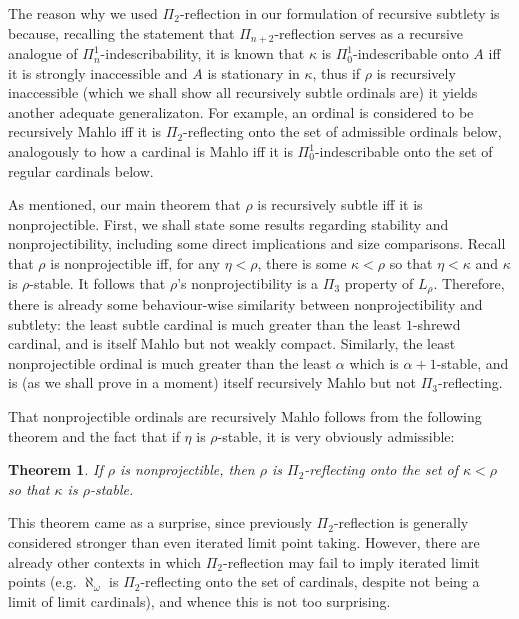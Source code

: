 \documentclass{article}
\theoremstyle{definition}
\theoremstyle{plain}
\newtheorem{theorem}[definition]{Theorem}
\theoremstyle{plain}
\theoremstyle{plain}
\theoremstyle{plain}
\theoremstyle{remark}
\theoremstyle{remark}
\theoremstyle{remark}
\theoremstyle{plain}
\theoremstyle{plain}
\theoremstyle{plain}
\begin{document}
The reason why we used $\Pi_2$-reflection in our formulation of recursive subtlety is because, recalling the statement that $\Pi_{n+2}$-reflection serves as a recursive analogue of $\Pi^1_n$-indescribability, it is known that $\kappa$ is $\Pi^1_0$-indescribable onto $A$ iff it is strongly inaccessible and $A$ is stationary in $\kappa$, thus if $\rho$ is recursively inaccessible (which we shall show all recursively subtle ordinals are) it yields another adequate generalizaton. For example, an ordinal is considered to be recursively Mahlo iff it is $\Pi_2$-reflecting onto the set of admissible ordinals below, analogously to how a cardinal is Mahlo iff it is $\Pi^1_0$-indescribable onto the set of regular cardinals below.

As mentioned, our main theorem that $\rho$ is recursively subtle iff it is nonprojectible. First, we shall state some results regarding stability and nonprojectibility, including some direct implications and size comparisons. Recall that $\rho$ is nonprojectible iff, for any $\eta < \rho$, there is some $\kappa < \rho$ so that $\eta < \kappa$ and $\kappa$ is $\rho$-stable. It follows that $\rho$'s nonprojectibility is a $\Pi_3$ property of $L_\rho$. Therefore, there is already some behaviour-wise similarity between nonprojectibility and subtlety: the least subtle cardinal is much greater than the least $1$-shrewd cardinal, and is itself Mahlo but not weakly compact. Similarly, the least nonprojectible ordinal is much greater than the least $\alpha$ which is $\alpha+1$-stable, and is (as we shall prove in a moment) itself recursively Mahlo but not $\Pi_3$-reflecting.

That nonprojectible ordinals are recursively Mahlo follows from the following theorem and the fact that if $\eta$ is $\rho$-stable, it is very obviously admissible:

\begin{theorem}
\label{NonprojectiblePi2Ref}
If $\rho$ is nonprojectible, then $\rho$ is $\Pi_2$-reflecting onto the set of $\kappa < \rho$ so that $\kappa$ is $\rho$-stable.
\end{theorem}

This theorem came as a surprise, since previously $\Pi_2$-reflection is generally considered stronger than even iterated limit point taking. However, there are already other contexts in which $\Pi_2$-reflection may fail to imply iterated limit points (e.g. $\aleph_\omega$ is $\Pi_2$-reflecting onto the set of cardinals, despite not being a limit of limit cardinals), and whence this is not too surprising.
\end{document}
